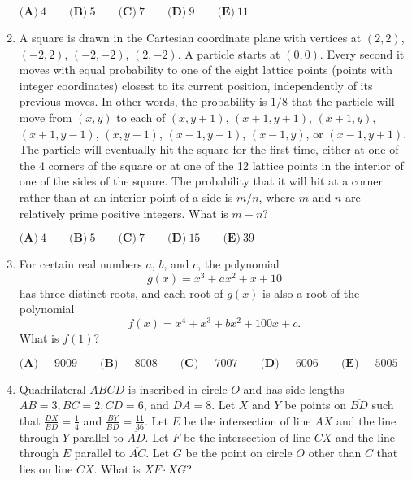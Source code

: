 \documentclass{article}
\begin{document}
\begin{enumerate}[label=\arabic*., itemsep=0.5em]
\(\textbf{(A)}\ 4 \qquad \textbf{(B)}\ 5 \qquad\textbf{(C)}\ 7 \qquad\textbf{(D)}\ 9 \qquad\textbf{(E)}\ 11\)\par \vspace{0.5em}\item A square is drawn in the Cartesian coordinate plane with vertices at \((2, 2)\), \((-2, 2)\), \((-2, -2)\), \((2, -2)\). A particle starts at \((0,0)\). Every second it moves with equal probability to one of the eight lattice points (points with integer coordinates) closest to its current position, independently of its previous moves. In other words, the probability is \(1/8\) that the particle will move from \((x, y)\) to each of \((x, y + 1)\), \((x + 1, y + 1)\), \((x + 1, y)\), \((x + 1, y - 1)\), \((x, y - 1)\), \((x - 1, y - 1)\), \((x - 1, y)\), or \((x - 1, y + 1)\). The particle will eventually hit the square for the first time, either at one of the 4 corners of the square or at one of the 12 lattice points in the interior of one of the sides of the square. The probability that it will hit at a corner rather than at an interior point of a side is \(m/n\), where \(m\) and \(n\) are relatively prime positive integers. What is \(m + n\)?

\(\textbf{(A)}\ 4 \qquad \textbf{(B)}\ 5 \qquad\textbf{(C)}\ 7 \qquad\textbf{(D)}\ 15 \qquad\textbf{(E)}\ 39\)\par \vspace{0.5em}\item For certain real numbers \(a\), \(b\), and \(c\), the polynomial 
\begin{equation*}
g(x) = x^3 + ax^2 + x + 10
\end{equation*}
has three distinct roots, and each root of \(g(x)\) is also a root of the polynomial 
\begin{equation*}
f(x) = x^4 + x^3 + bx^2 + 100x + c.
\end{equation*}
What is \(f(1)\)?

\(\textbf{(A)}\ -9009 \qquad\textbf{(B)}\ -8008 \qquad\textbf{(C)}\ -7007 \qquad\textbf{(D)}\ -6006 \qquad\textbf{(E)}\ -5005\)\par \vspace{0.5em}\item Quadrilateral \(ABCD\) is inscribed in circle \(O\) and has side lengths \(AB=3, BC=2, CD=6\), and \(DA=8\). Let \(X\) and \(Y\) be points on \(\overline{BD}\) such that \(\frac{DX}{BD} = \frac{1}{4}\) and \(\frac{BY}{BD} = \frac{11}{36}\). Let \(E\) be the intersection of line \(AX\) and the line through \(Y\) parallel to \(\overline{AD}\). Let \(F\) be the intersection of line \(CX\) and the line through \(E\) parallel to \(\overline{AC}\). Let \(G\) be the point on circle \(O\) other than \(C\) that lies on line \(CX\). What is \(XF\cdot XG\)?


\end{enumerate}
\end{document}
